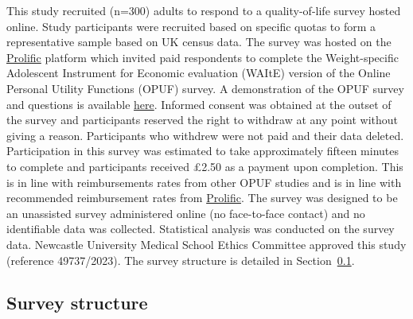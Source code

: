 \documentclass[
  number,
  preprint]{elsarticle}
\begin{document}
This study recruited (n=300) adults to respond to a quality-of-life
survey hosted online. Study participants were recruited based on
specific quotas to form a representative sample based on UK census data.
The survey was hosted on the \href{https://www.prolific.com}{Prolific}
platform which invited paid respondents to complete the Weight-specific
Adolescent Instrument for Economic evaluation (WAItE) version of the
Online Personal Utility Functions (OPUF) survey. A demonstration of the
OPUF survey and questions is available
\href{https://survey.valorem.health/waite_opuf_adult2}{here}. Informed
consent was obtained at the outset of the survey and participants
reserved the right to withdraw at any point without giving a reason.
Participants who withdrew were not paid and their data deleted.
Participation in this survey was estimated to take approximately fifteen
minutes to complete and participants received £2.50 as a payment upon
completion. This is in line with reimbursements rates from other OPUF
studies \citep{Schneider2022TheStates, Bray2024DevelopmentImpairment}
and is in line with recommended reimbursement rates from
\href{https://www.prolific.com}{Prolific}. The survey was designed to be
an unassisted survey administered online (no face-to-face contact) and
no identifiable data was collected. Statistical analysis was conducted
on the survey data. Newcastle University Medical School Ethics Committee
approved this study (reference 49737/2023). The survey structure is
detailed in Section~\ref{sec-surveystructure}.

\subsection{Survey structure}\label{sec-surveystructure}
\end{document}
